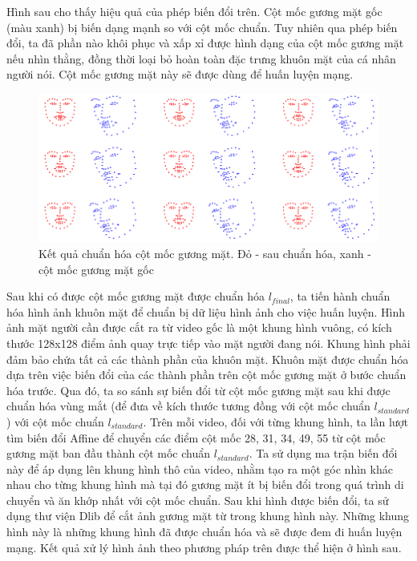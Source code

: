 Hình sau cho thấy hiệu quả của phép biến đổi trên. Cột mốc gương mặt gốc (màu xanh) bị biến dạng mạnh so với cột mốc chuẩn. Tuy nhiên qua phép biến đổi, ta đã phần nào khôi phục và xấp xỉ được hình dạng của cột mốc gương mặt nếu nhìn thằng, đồng thời loại bỏ hoàn toàn đặc trưng khuôn mặt của cá nhân người nói. Cột mốc gương mặt này sẽ được dùng để huấn luyện mạng.

\begin{figure}[H]
    \centering
    \includegraphics[width=15cm]{./content/materials/standardize_landmark.png}
    \caption{Kết quả chuẩn hóa cột mốc gương mặt. Đỏ - sau chuẩn hóa, xanh - cột mốc gương mặt gốc}
\end{figure}

Sau khi có được cột mốc gương mặt được chuẩn hóa $l_{final}$, ta tiến hành chuẩn hóa hình ảnh khuôn mặt để chuẩn bị dữ liệu hình ảnh cho việc huấn luyện. Hình ảnh mặt người cần được cắt ra từ video gốc là một khung hình vuông, có kích thước 128x128 điểm ảnh quay trực tiếp vào mặt người đang nói. Khung hình phải đảm bảo chứa tất cả các thành phần của khuôn mặt. Khuôn mặt được chuẩn hóa dựa trên việc biến đổi của các thành phần trên cột mốc gương mặt ở bước chuẩn hóa trước. Qua đó, ta so sánh sự biến đổi từ cột mốc gương mặt sau khi được chuẩn hóa vùng mắt (để đưa về kích thước tương đồng với cột mốc chuẩn $l_{standard}$) với cột mốc chuẩn $l_{standard}$. Trên mỗi video, đối với từng khung hình, ta lần lượt tìm biến đổi Affine để chuyển các điểm cột mốc 28, 31, 34, 49, 55 từ cột mốc gương mặt ban đầu thành cột mốc chuẩn $l_{standard}$. Ta sử dụng ma trận biến đổi này để áp dụng lên khung hình thô của video, nhằm tạo ra một góc nhìn khác nhau cho từng khung hình mà tại đó gương mặt ít bị biến đổi trong quá trình di chuyển và ăn khớp nhất với cột mốc chuẩn. Sau khi hình được biến đổi, ta sử dụng thư viện Dlib để cắt ảnh gương mặt từ trong khung hình này. Những khung hình này là những khung hình đã được chuẩn hóa và sẽ được đem đi huấn luyện mạng. Kết quả xử lý hình ảnh theo phương pháp trên được thể hiện ở hình sau.

